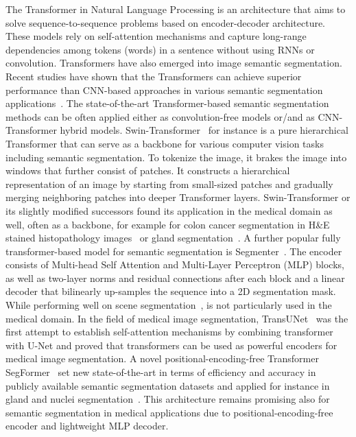 The Transformer in  Natural Language Processing is an architecture that aims to solve sequence-to-sequence problems based on encoder-decoder architecture. These models rely on self-attention mechanisms and capture long-range dependencies among tokens (words) in a sentence without using RNNs or convolution. Transformers have also emerged into image semantic segmentation. Recent studies have shown that the Transformers can achieve superior performance than CNN-based approaches in various semantic segmentation applications~\cite{nguyen2022evaluating}. The state-of-the-art Transformer-based semantic segmentation methods can be often applied either as convolution-free models or/and as CNN-Transformer hybrid models. Swin-Transformer~\cite{liu2021swin} for instance is a pure hierarchical Transformer that can serve as a  backbone for various computer vision tasks including semantic segmentation. To tokenize the image, it brakes the image into windows that further consist of patches. It constructs a hierarchical representation of an image by starting from small-sized patches and gradually merging neighboring patches into deeper Transformer layers. Swin-Transformer or its slightly modified successors found its application in the medical domain as well, often as a backbone, for example for colon cancer segmentation in H\&E stained histopathology images~\cite{qian2022transformer} or gland segmentation~\cite{lin2022ds}. A further popular fully transformer-based model for semantic segmentation is Segmenter~\cite{strudel2021segmenter}. The encoder consists of Multi-head Self Attention and Multi-Layer Perceptron (MLP) blocks, as well as two-layer norms and residual connections after each block and a linear decoder that bilinearly up-samples the sequence into a 2D segmentation mask. While performing well on scene segmentation~\cite{strudel2021segmenter}, is not particularly used in the medical domain. In the field of medical image segmentation, TransUNet~\cite{chen2021transunet} was the first attempt to establish self-attention mechanisms by combining transformer with U-Net and proved that transformers can be used as powerful encoders for medical image segmentation. A novel positional-encoding-free Transformer SegFormer~\cite{https://doi.org/10.48550/arxiv.2105.15203} set new state-of-the-art in terms of efficiency and accuracy in publicly available semantic segmentation datasets and applied for instance in gland and nuclei segmentation~\cite{lin2022ds}. This architecture remains promising also for semantic segmentation in medical applications due to positional-encoding-free encoder and lightweight MLP decoder.

